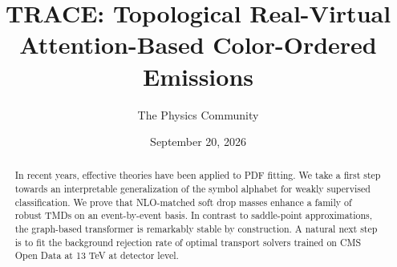 \documentclass[11pt]{article}
\title{TRACE: Topological Real-Virtual Attention-Based Color-Ordered Emissions}
\author{The Physics Community}
\date{September 20, 2026}
\numberwithin{equation}{section}
\theoremstyle{definition}
\theoremstyle{remark}
\begin{document}
\maketitle
\begin{abstract}
In recent years, effective theories have been applied to PDF fitting. We
take a first step towards an interpretable generalization of the symbol
alphabet for weakly supervised classification. We prove that NLO-matched
soft drop masses enhance a family of robust TMDs on an event-by-event
basis. In contrast to saddle-point approximations, the graph-based
transformer is remarkably stable by construction. A natural next step is
to fit the background rejection rate of optimal transport solvers
trained on CMS Open Data at 13 TeV at detector level.
\end{abstract}
\tableofcontents



\nocite{*}


\end{document}
